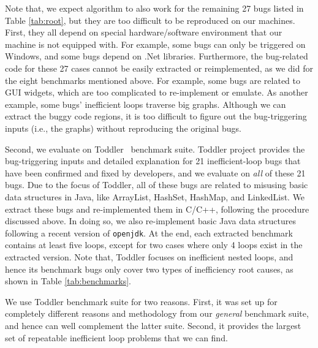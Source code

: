 Note that, we expect \Tool algorithm to also work for the remaining 27 bugs 
listed in Table \ref{tab:root}, but they are too difficult to be reproduced
on our machines.
First, they all depend on 
special hardware/software environment that our machine is not equipped with.
For example, some bugs can only be triggered on Windows, and some bugs depend on 
.Net libraries. 
Furthermore, the bug-related code for these 27 cases
cannot be easily extracted or reimplemented, as we did for the eight 
benchmarks mentioned above. 
For example, some bugs are related to GUI widgets, which are too complicated to 
re-implement or emulate. As another example, some bugs' inefficient 
loops traverse big graphs. Although we can extract the buggy code regions, it is 
too difficult to figure out the bug-triggering inputs
(i.e., the graphs) without reproducing the original bugs. 

Second, we evaluate \Tool on Toddler~\cite{Alabama, toddlerbuglist} benchmark suite.
Toddler project provides the bug-triggering inputs and detailed explanation
for 21 inefficient-loop bugs that have been confirmed and fixed by developers, and
we evaluate \Tool on \emph{all} of these 21 bugs.
Due to the focus of Toddler, all of these bugs 
are related to misusing basic data structures in Java, like ArrayList, HashSet, 
HashMap, and LinkedList. We extract these bugs and re-implemented them in 
C/C++, following the procedure discussed above. In doing so,
we also re-implement basic Java data structures following a recent version of 
\texttt{openjdk}. At the end, each extracted benchmark contains at least five
loops, except for two cases where only 4 loops exist in the extracted version. 
Note that, Toddler focuses on inefficient nested loops, and hence its
benchmark bugs only cover two types of inefficiency root causes,
as shown in Table \ref{tab:benchmarks}.

We use Toddler benchmark suite for two reasons.
First, it was set up for completely different reasons and methodology from our
\emph{general} benchmark suite,
and hence can well complement the latter suite.
Second, it provides the largest set of 
repeatable inefficient loop problems that we can find. 

